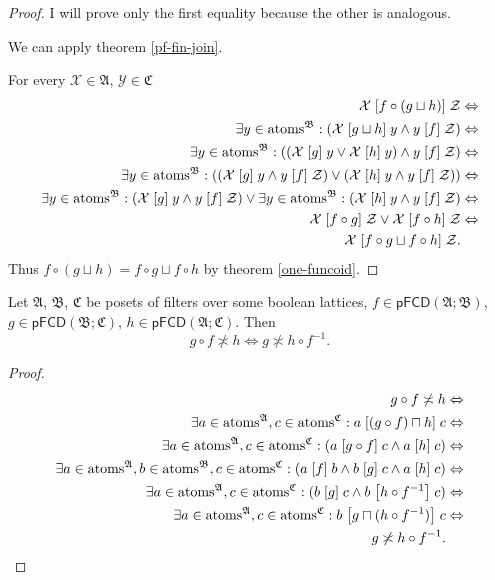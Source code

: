 \begin{proof}
I will prove only the first equality because the other is analogous.

We can apply theorem \ref{pf-fin-join}.

For every $\mathcal{X}\in\mathfrak{A}$, $\mathcal{Y}\in\mathfrak{C}$
\begin{align*}
\mathcal{X}\mathrel{\left[f\circ(g\sqcup h)\right]}\mathcal{Z} & \Leftrightarrow\\
\exists y\in\operatorname{atoms}^{\mathfrak{B}}:(\mathcal{X}\mathrel{\left[g\sqcup h\right]}y\land y\mathrel{\left[f\right]}\mathcal{Z}) & \Leftrightarrow\\
\exists y\in\operatorname{atoms}^{\mathfrak{B}}:((\mathcal{X}\mathrel{\left[g\right]}y\lor\mathcal{X}\mathrel{\left[h\right]}y)\land y\mathrel{\left[f\right]}\mathcal{Z}) & \Leftrightarrow\\
\exists y\in\operatorname{atoms}^{\mathfrak{B}}:((\mathcal{X}\mathrel{\left[g\right]}y\land y\mathrel{\left[f\right]}\mathcal{Z})\lor(\mathcal{X}\mathrel{\left[h\right]}y\land y\mathrel{\left[f\right]}\mathcal{Z})) & \Leftrightarrow\\
\exists y\in\operatorname{atoms}^{\mathfrak{B}}:(\mathcal{X}\mathrel{\left[g\right]}y\land y\mathrel{\left[f\right]}\mathcal{Z})\lor\exists y\in\operatorname{atoms}^{\mathfrak{B}}:(\mathcal{X}\mathrel{\left[h\right]}y\land y\mathrel{\left[f\right]}\mathcal{Z}) & \Leftrightarrow\\
\mathcal{X}\mathrel{\left[f\circ g\right]}\mathcal{Z}\lor\mathcal{X}\mathrel{\left[f\circ h\right]}\mathcal{Z} & \Leftrightarrow\\
\mathcal{X}\mathrel{\left[f\circ g\sqcup f\circ h\right]}\mathcal{Z}.
\end{align*}
Thus $f\circ(g\sqcup h)=f\circ g\sqcup f\circ h$ by theorem \ref{one-funcoid}.\end{proof}
\begin{thm}
\label{qi-bool}Let $\mathfrak{A}$, $\mathfrak{B}$, $\mathfrak{C}$
be posets of filters over some boolean lattices, $f\in\mathsf{pFCD}(\mathfrak{A};\mathfrak{B})$,
$g\in\mathsf{pFCD}(\mathfrak{B};\mathfrak{C})$, $h\in\mathsf{pFCD}(\mathfrak{A};\mathfrak{C})$.
Then 
\[
g\circ f\nasymp h\Leftrightarrow g\nasymp h\circ f^{-1}.
\]
\end{thm}
\begin{proof}
~
\begin{align*}
g\circ f\not\asymp h & \Leftrightarrow\\
\exists a\in\operatorname{atoms}^{\mathfrak{A}},c\in\operatorname{atoms}^{\mathfrak{C}}:a\mathrel{\left[(g\circ f)\sqcap h\right]}c & \Leftrightarrow\\
\exists a\in\operatorname{atoms}^{\mathfrak{A}},c\in\operatorname{atoms}^{\mathfrak{C}}:(a\mathrel{\left[g\circ f\right]}c\land a\mathrel{\left[h\right]}c) & \Leftrightarrow\\
\exists a\in\operatorname{atoms}^{\mathfrak{A}},b\in\operatorname{atoms}^{\mathfrak{B}},c\in\operatorname{atoms}^{\mathfrak{C}}:(a\mathrel{\left[f\right]}b\land b\mathrel{\left[g\right]}c\land a\mathrel{\left[h\right]}c) & \Leftrightarrow\\
\exists a\in\operatorname{atoms}^{\mathfrak{A}},c\in\operatorname{atoms}^{\mathfrak{C}}:(b\mathrel{\left[g\right]}c\land b\mathrel{\left[h\circ f^{-1}\right]}c) & \Leftrightarrow\\
\exists a\in\operatorname{atoms}^{\mathfrak{A}},c\in\operatorname{atoms}^{\mathfrak{C}}:b\mathrel{\left[g\sqcap(h\circ f^{-1})\right]}c & \Leftrightarrow\\
g\not\asymp h\circ f^{-1}.
\end{align*}

\end{proof}

